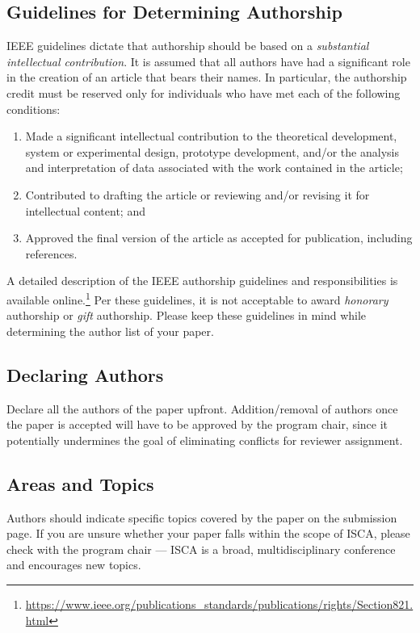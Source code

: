 \documentclass[conference]{IEEEtran}
\begin{document}
\subsection{Guidelines for Determining Authorship}
IEEE guidelines dictate that authorship should be based on a {\em
  substantial intellectual contribution}. It is assumed that all
authors have had a significant role in the creation of an article that
bears their names. In particular, the authorship credit must be
reserved only for individuals who have met each of the following
conditions:

\begin{enumerate}
\item Made a significant intellectual contribution to the theoretical
  development, system or experimental design, prototype development,
  and/or the analysis and interpretation of data associated with the
  work contained in the article;

\item Contributed to drafting the article or reviewing and/or revising
  it for intellectual content; and

\item Approved the final version of the article as accepted for publication, including references.
\end{enumerate}

A detailed description of the IEEE authorship guidelines and
responsibilities is available online.\footnote{\url{https://www.ieee.org/publications_standards/publications/rights/Section821.html}} Per
these guidelines, it is not acceptable to award {\em honorary}
authorship or {\em gift} authorship. Please keep these guidelines in
mind while determining the author list of your paper.

\subsection{Declaring Authors}
Declare all the authors of the paper upfront. Addition/removal of
authors once the paper is accepted will have to be approved by the
program chair, since it potentially undermines the goal of eliminating
conflicts for reviewer assignment.

\subsection{Areas and Topics}
Authors should indicate specific topics covered by the paper on the
submission page. If you are unsure whether your paper falls within the
scope of ISCA, please check with the program chair --- ISCA is a broad,
multidisciplinary conference and encourages new topics.
\end{document}

